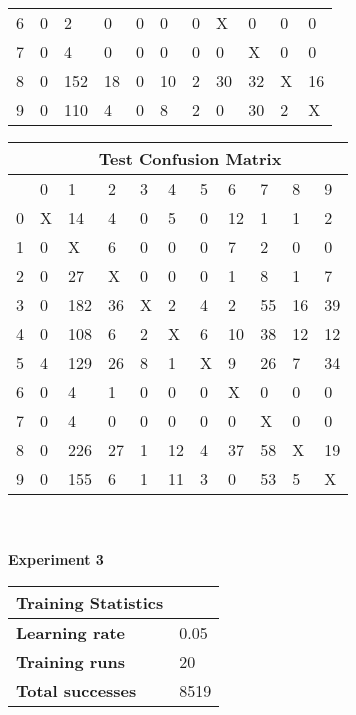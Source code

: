 \documentclass[titlepage,11pt]{article}
\begin{document}
{\begin{tabular}{|l|llllllllll|}
        6&    0&   2&   0&   0&   0&   0&   X&   0&   0&   0\\
        7&    0&   4&   0&   0&   0&   0&   0&   X&   0&   0\\
        8&    0& 152&  18&   0&  10&   2&  30&  32&   X&  16\\
        9&    0& 110&   4&   0&   8&   2&   0&  30&   2&   X\\
        \hline
        \end{tabular}
        \hspace{5pt}
        \begin{tabular}{|l|llllllllll|}
        \hline
        &\multicolumn{10}{c|}{\textbf{Test Confusion Matrix}}\\
        \hline
        &     0&   1&   2&   3&   4&   5&   6&   7&   8&   9\\
        \hline
        0&    X&  14&   4&   0&   5&   0&  12&   1&   1&   2\\
        1&    0&   X&   6&   0&   0&   0&   7&   2&   0&   0\\
        2&    0&  27&   X&   0&   0&   0&   1&   8&   1&   7\\
        3&    0& 182&  36&   X&   2&   4&   2&  55&  16&  39\\
        4&    0& 108&   6&   2&   X&   6&  10&  38&  12&  12\\
        5&    4& 129&  26&   8&   1&   X&   9&  26&   7&  34\\
        6&    0&   4&   1&   0&   0&   0&   X&   0&   0&   0\\
        7&    0&   4&   0&   0&   0&   0&   0&   X&   0&   0\\
        8&    0& 226&  27&   1&  12&   4&  37&  58&   X&  19\\
        9&    0& 155&   6&   1&  11&   3&   0&  53&   5&   X\\
        \hline
        \end{tabular}\\
    \vspace{2pt}\\
    \textbf{Experiment 3}\\
        \begin{tabular}{l|l}
        \textbf{Training Statistics}&\\
        \hline
        \textbf{Learning rate}&         0.05\\
        \textbf{Training runs}&         20\\
        \textbf{Total successes}&       8519\\

\end{tabular}}
\end{document}
